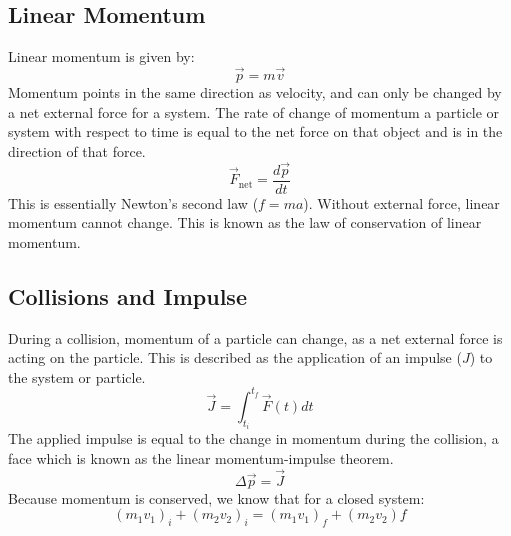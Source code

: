\documentclass[12pt]{report}
\begin{document}
\subsection*{Linear Momentum}
Linear momentum is given by:
\[\vec{p} = m\vec{v}\]
Momentum points in the same direction as velocity, and can only be changed by a net
external force for a system. The rate of change of momentum a particle or system with
respect to time is equal to the net force on that object and is in the direction of that force. 
\[\vec{F}_\mathrm{net} = \frac{d\vec{p}}{dt}\]
This is essentially Newton's second law (\(f = ma\)). Without external force, linear
momentum cannot change. This is known as the law of conservation of linear momentum.

\subsection*{Collisions and Impulse}
During a collision, momentum of a particle can change, as a net external force is acting
on the particle. This is described as the application of an impulse (\(J\)) to the system or particle.
\[\vec{J} = \int^{t_f}_{t_i}\vec{F}(t)dt\]
The applied impulse is equal to the change in momentum during the collision, a face which is 
known as the linear momentum-impulse theorem.
\[\Delta\vec{p} = \vec{J}\]
Because momentum is conserved, we know that for a closed system:
\[(m_1v_1)_i + (m_2v_2)_i = (m_1v_1)_f + (m_2v_2)f\]
\end{document}
